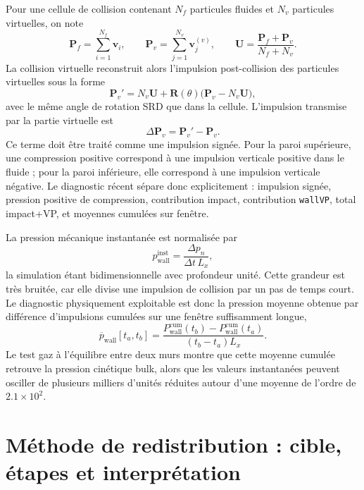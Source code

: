 \documentclass[11pt,a4paper]{article}
\begin{document}
Pour une cellule de collision contenant \(N_f\) particules fluides et \(N_v\) particules virtuelles, on note
\begin{equation}
  \bm P_f = \sum_{i=1}^{N_f}\bm v_i,
  \qquad
  \bm P_v = \sum_{j=1}^{N_v}\bm v_j^{(v)},
  \qquad
  \bm U = \frac{\bm P_f+\bm P_v}{N_f+N_v}.
\end{equation}
La collision virtuelle reconstruit alors l'impulsion post-collision des particules virtuelles sous la forme
\begin{equation}
  \bm P_v' = N_v\bm U + \mathbf R(\theta)\bigl(\bm P_v-N_v\bm U\bigr),
\end{equation}
avec le même angle de rotation SRD que dans la cellule. L'impulsion transmise par la partie virtuelle est
\begin{equation}
  \Delta \bm P_v = \bm P_v' - \bm P_v.
\end{equation}
Ce terme doit être traité comme une impulsion signée. Pour la paroi supérieure, une compression positive correspond à une impulsion verticale positive dans le fluide ; pour la paroi inférieure, elle correspond à une impulsion verticale négative. Le diagnostic récent sépare donc explicitement : impulsion signée, pression positive de compression, contribution impact, contribution \texttt{wallVP}, total impact+VP, et moyennes cumulées sur fenêtre.

La pression mécanique instantanée est normalisée par
\begin{equation}
  p_{\mathrm{wall}}^{\mathrm{inst}} = \frac{\Delta p_n}{\Delta t\,L_x},
\end{equation}
la simulation étant bidimensionnelle avec profondeur unité. Cette grandeur est très bruitée, car elle divise une impulsion de collision par un pas de temps court. Le diagnostic physiquement exploitable est donc la pression moyenne obtenue par différence d'impulsions cumulées sur une fenêtre suffisamment longue,
\begin{equation}
  \overline p_{\mathrm{wall}}[t_a,t_b]
  = \frac{P_{\mathrm{wall}}^{\mathrm{cum}}(t_b)-P_{\mathrm{wall}}^{\mathrm{cum}}(t_a)}{(t_b-t_a)L_x}.
\end{equation}
Le test gaz à l'équilibre entre deux murs montre que cette moyenne cumulée retrouve la pression cinétique bulk, alors que les valeurs instantanées peuvent osciller de plusieurs milliers d'unités réduites autour d'une moyenne de l'ordre de \(2.1\times10^2\).

\section{Méthode de redistribution : cible, étapes et interprétation}
\end{document}
